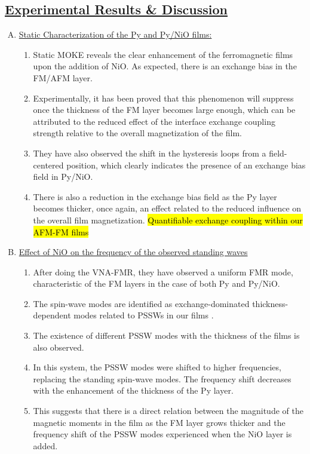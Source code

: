 \subsection*{\underline{Experimental Results \& Discussion}}
\begin{enumerate}[A.]
    \item \underline{Static Characterization of the Py and Py/NiO films:}
    \begin{enumerate}[1.]
        \item Static MOKE reveals the clear enhancement of the ferromagnetic films upon the addition of NiO. As expected, there is an exchange bias in the FM/AFM layer.
        \item Experimentally, it has been proved that this phenomenon will suppress once the thickness of the FM layer becomes large enough, which can be attributed to the reduced effect of the interface exchange coupling strength relative to the overall magnetization of the film.
        \item They have also observed the shift in the hysteresis loops from a field-centered position, which clearly indicates the presence of an exchange bias field in Py/NiO.
        \item There is also a reduction in the exchange bias field as the Py layer becomes thicker, once again, an effect related to the reduced influence on the overall film magnetization. \hl{Quantifiable exchange coupling within our AFM-FM films}
    \end{enumerate}
    \item \underline{Effect of NiO on the frequency of the observed standing waves}
    \begin{enumerate}[1.]
        \item After doing the VNA-FMR, they have observed a uniform FMR mode, characteristic of the FM layers in the case of both Py and Py/NiO.
        \item The spin-wave modes are identified as exchange-dominated thickness-dependent modes related to PSSWs in our films \cite{dabrowski2021canted}.
        \item The existence of different PSSW modes with the thickness of the films is also observed. 
        \item In this system, the PSSW modes were shifted to higher frequencies, replacing the standing spin-wave modes. The frequency shift decreases with the enhancement of the thickness of the Py layer.
        \item This suggests that there is a direct relation between the magnitude of the magnetic moments in the film as the FM layer grows thicker and the frequency shift of the PSSW modes experienced when the NiO layer is added.

\end{enumerate}
\end{enumerate}
